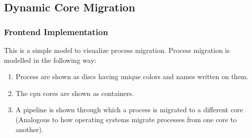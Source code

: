 \documentclass[12pt]{article}
\begin{document}
\subsection{Dynamic Core Migration}
\subsubsection{Frontend Implementation}

This is a simple model to visualize process migration. Process migration is modelled in the following way:
\begin{enumerate}
    \item Process are shown as discs having unique colors and names written on them.
    \item The cpu cores are shown as containers.
    \item A pipeline is shown through which a process is migrated to a different core (Analogous to how operating systems migrate processes from one core to another).
\end{enumerate}
\end{document}
